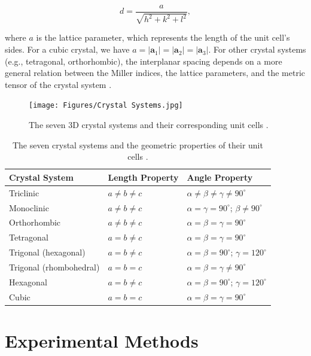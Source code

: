 \documentclass[aps,prb,twocolumn,superscriptaddress]{revtex4-2}
\begin{document}
\begin{equation}\label{eq:interplanar}
    d = \frac{a}{\sqrt{h^2 + k^2 + l^2}},
\end{equation}

where $a$ is the lattice parameter, which represents the length of the unit
cell's sides.  For a cubic crystal, we have $a = |\textbf{a}_1| = |\textbf{a}_2|
= |\textbf{a}_3|$.  For other crystal systems (e.g., tetragonal, orthorhombic),
the interplanar spacing depends on a more general relation between the Miller
indices, the lattice parameters, and the metric tensor of the crystal system
\cite{Liu2020}.

\begin{figure}[h]
    \centering
    \texttt{[image: Figures/Crystal Systems.jpg]}
    \caption{The seven 3D crystal systems and their corresponding unit cells
    \cite{OpenGeology_CrystalMorphology}.}
    \label{fig:CrystalSystems}
\end{figure}

\begin{table}[h!]
\centering
\begin{tabular}{|l|l|l|}
\hline
\textbf{Crystal System} & \textbf{Length Property} & \textbf{Angle Property} \\ \hline
Triclinic & $a \neq b \neq c$ & $\alpha \neq \beta \neq \gamma \neq 90^\circ$ \\ \hline
Monoclinic & $a \neq b \neq c$ & $\alpha = \gamma = 90^\circ$; $\beta \neq 90^\circ$ \\ \hline
Orthorhombic & $a \neq b \neq c$ & $\alpha = \beta = \gamma = 90^\circ$ \\ \hline
Tetragonal & $a = b \neq c$ & $\alpha = \beta = \gamma = 90^\circ$ \\ \hline
Trigonal (hexagonal) & $a = b \neq c$ & $\alpha = \beta = 90^\circ$; $\gamma = 120^\circ$ \\ \hline
Trigonal (rhombohedral) & $a = b = c$ & $\alpha = \beta = \gamma \neq 90^\circ$ \\ \hline
Hexagonal & $a = b \neq c$ & $\alpha = \beta = 90^\circ$; $\gamma = 120^\circ$ \\ \hline
Cubic & $a = b = c$ & $\alpha = \beta = \gamma = 90^\circ$ \\ \hline
\end{tabular}
\caption{The seven crystal systems and the geometric properties of their unit cells
\cite{LEPEVELEN20102559}.}
\end{table}


\section{Experimental Methods} \label{sec:experiment}
\end{document}
